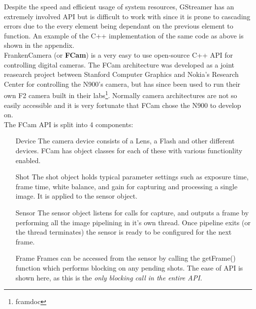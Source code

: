 \documentclass[11pt]{article} %
\begin{document}
Despite the speed and efficient usage of system resources, GStreamer has an extremely involved API but is difficult to work with since it is prone to cascading errors due to the every element being dependant on the previous element to function. An example of the C++ implementation of the same code as above is shown in the appendix.\\

FrankenCamera (or {\bf FCam}) is a very easy to use open-source C++ API for controlling digital cameras.  The FCam architecture was developed as a joint reasearch project between Stanford Computer Graphics and Nokia's Research Center for controlling the N900's camera, but has since been used to run their own F2 camera built in their labs\footnote{fcamdoc}. Normally camera architectures are not so easily accessible and it is very fortunate that FCam chose the N900 to develop on.
\pagebreak
\\The FCam API is split into 4 components:
\begin{enumerate}
\item[Device]{The camera device consists of a Lens, a Flash and other different devices. FCam has object classes for each of these with various functionlity enabled.}
\item[Shot]{The shot object holds typical parameter settings such as exposure time, frame time, white balance, and gain for capturing and processing a single image. It is applied to the sensor object.}
\item[Sensor]{The sensor object listens for calls for capture, and outputs a frame by performing all the image pipelining in it's own thread. Once pipeline exits (or the thread terminates) the sensor is ready to be configured for the next frame.}
\item[Frame]{Frames can be accessed from the sensor by calling the getFrame() function which performs blocking on any pending shots. The ease of API is shown here, as this is the \it{only} blocking call in the entire API.}
\end{enumerate}
\end{document}
